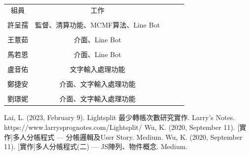 \documentclass[conference]{IEEEtran}
\begin{document}
\begin{CJK*}{UTF8}{bsmi}
\begin{table}[hbt!]
\begin{tabular}{|c|c|lll}
\cline{1-2}
    \\[-1em]
組員                        & 工作                      &  &  &  \\ \cline{1-2}
    \\[-1em]
許呈孺                       & 監督、清算功能、MCMF算法、Line Bot &  &  &  \\ \cline{1-2}
    \\[-1em]
王薏茹                       & 介面、Line Bot             &  &  &  \\ \cline{1-2}
    \\[-1em]
馬若恩                       & 介面、Line Bot             &  &  &  \\ \cline{1-2}
    \\[-1em]
盧音佑                       & 文字輸入處理功能                &  &  &  \\ \cline{1-2}
    \\[-1em]
\multicolumn{1}{|l|}{鄭捷安} & 介面、文字輸入處理功能             &  &  &  \\ \cline{1-2}
    \\[-1em]
\multicolumn{1}{|l|}{劉璟妮} & 介面、文字輸入處理功能             &  &  &  \\ \cline{1-2}
\end{tabular}
\end{table}

\begin{thebibliography}{00}
 Lai, L. (2023, February 9). Lightsplit 最少轉帳次數研究實作. Larry’s Notes. https://www.larrysprognotes.com/Lightsplit/
 Wu, K. (2020, September 11). [實作]多人分帳程式 — 分帳邏輯及User Story. Medium.
 Wu, K. (2020, September 11). [實作]多人分帳程式(二) — JS陣列、物件概念. Medium.
\end{thebibliography}
\vspace{12pt}

\end{CJK*}
\end{document}
